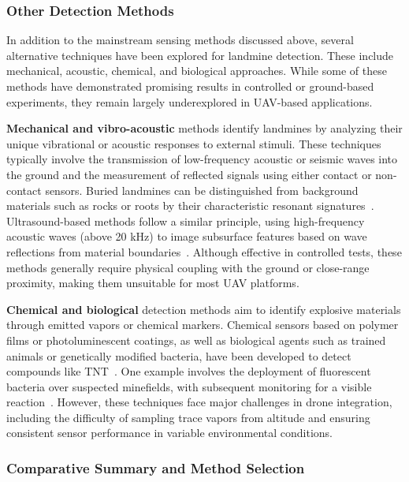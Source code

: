 \subsubsection{Other Detection Methods}\label{other_detection_methods}

In addition to the mainstream sensing methods discussed above, several alternative techniques have been explored for landmine detection. These include mechanical, acoustic, chemical, and biological approaches. While some of these methods have demonstrated promising results in controlled or ground-based experiments, they remain largely underexplored in \gls{UAV}-based applications.

\textbf{Mechanical and vibro-acoustic} methods identify landmines by analyzing their unique vibrational or acoustic responses to external stimuli. These techniques typically involve the transmission of low-frequency acoustic or seismic waves into the ground and the measurement of reflected signals using either contact or non-contact sensors. Buried landmines can be distinguished from background materials such as rocks or roots by their characteristic resonant signatures~\cite{Gooneratne2004ARO,gichd2006guidebook}. Ultrasound-based methods follow a similar principle, using high-frequency acoustic waves (above 20 kHz) to image subsurface features based on wave reflections from material boundaries~\cite{paik2002image,cardonalandmine}. Although effective in controlled tests, these methods generally require physical coupling with the ground or close-range proximity, making them unsuitable for most \gls{UAV} platforms.

\textbf{Chemical and biological} detection methods aim to identify explosive materials through emitted vapors or chemical markers. Chemical sensors based on polymer films or photoluminescent coatings, as well as biological agents such as trained animals or genetically modified bacteria, have been developed to detect compounds like \gls{TNT}~\cite{Gooneratne2004ARO,alqudsi2021review}. One example involves the deployment of fluorescent bacteria over suspected minefields, with subsequent monitoring for a visible reaction~\cite{cardonalandmine}. However, these techniques face major challenges in drone integration, including the difficulty of sampling trace vapors from altitude and ensuring consistent sensor performance in variable environmental conditions.



\subsubsection{Comparative Summary and Method Selection}\label{sensor_compare_select}


